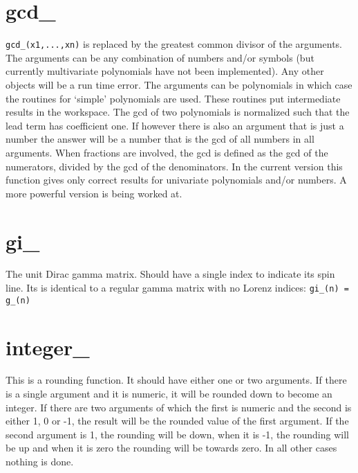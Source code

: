 \section{gcd\_}
\label{fungcd}
\noindent \verb:gcd_(x1,...,xn): is replaced by the greatest common divisor 
of the arguments. The arguments can be any combination of numbers and/or 
symbols (but currently multivariate polynomials have not been implemented). 
Any other objects will be a run time error. The arguments can be 
polynomials in which case the routines for `simple' polynomials are used. 
These routines put intermediate results in the workspace. The gcd of two 
polynomials is normalized such that the lead term has coefficient one. If 
however there is also an argument that is just a number the answer will be 
a number that is the gcd of all numbers in all arguments. When fractions 
are involved, the gcd is defined as the gcd of the numerators, divided by 
the gcd of the denominators. In the current version this function gives 
only correct results for univariate polynomials and/or numbers. A more 
powerful version is being worked at.

\section{gi\_}
\label{fungi}
\noindent The unit Dirac gamma matrix. Should have a single index 
to indicate its spin line. Its is identical to a regular gamma matrix with 
no Lorenz indices: \verb:gi_(n) = g_(n):

\section{integer\_}
\label{funinteger}
\noindent This is a rounding function. It should have 
either one or two arguments. If there is a single argument and it is 
numeric, it will be rounded down to become an integer. If there are two 
arguments of which the first is numeric and the second is either 1, 0 or 
-1, the result will be the rounded value of the first argument. If the 
second argument is 1, the rounding will be down, when it is -1, the 
rounding will be up and when it is zero the rounding will be towards zero. 
In all other cases nothing is done.

